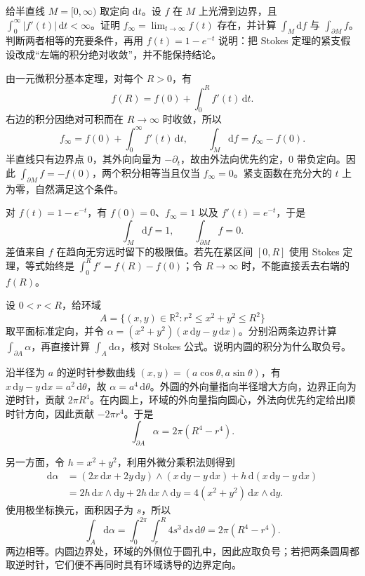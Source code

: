 \begin{exercise}\label{g1:ex:stokes-noncompact-end}
	给半直线 \(M=[0,\infty)\) 取定向 \(\mathrm{d}t\)。设 \(f\) 在 \(M\) 上光滑到边界，且 \(\int_0^\infty|f'(t)|\,\mathrm{d}t<\infty\)。证明 \(f_\infty=\lim_{t\to\infty}f(t)\) 存在，并计算 \(\int_M\mathrm{d}f\) 与 \(\int_{\partial M}f\)。判断两者相等的充要条件，再用 \(f(t)=1-e^{-t}\) 说明：把 Stokes 定理的紧支假设改成“左端的积分绝对收敛”，并不能保持结论。
\end{exercise}
\begin{solution}
	由一元微积分基本定理，对每个 \(R>0\)，有
	\[
		f(R)=f(0)+\int_0^R f'(t)\,\mathrm{d}t.
	\]
	右边的积分因绝对可积而在 \(R\to\infty\) 时收敛，所以
	\[
		f_\infty=f(0)+\int_0^\infty f'(t)\,\mathrm{d}t,\qquad
		\int_M\mathrm{d}f=f_\infty-f(0).
	\]
	半直线只有边界点 \(0\)，其外向向量为 \(-\partial_t\)，故由外法向优先约定，\(0\) 带负定向。因此 \(\int_{\partial M}f=-f(0)\)，两个积分相等当且仅当 \(f_\infty=0\)。紧支函数在充分大的 \(t\) 上为零，自然满足这个条件。

	对 \(f(t)=1-e^{-t}\)，有 \(f(0)=0\)、\(f_\infty=1\) 以及 \(f'(t)=e^{-t}\)，于是
	\[
		\int_M\mathrm{d}f=1,\qquad \int_{\partial M}f=0.
	\]
	差值来自 \(f\) 在趋向无穷远时留下的极限值。若先在紧区间 \([0,R]\) 使用 Stokes 定理，等式始终是 \(\int_0^R f'=f(R)-f(0)\)；令 \(R\to\infty\) 时，不能直接丢去右端的 \(f(R)\)。
\end{solution}

\begin{exercise}\label{g1:ex:stokes-annulus-orientation}
	设 \(0<r<R\)，给环域
	\[
		A=\{(x,y)\in\mathbb R^2:r^2\leq x^2+y^2\leq R^2\}
	\]
	取平面标准定向，并令 \(\alpha=(x^2+y^2)(x\,\mathrm{d}y-y\,\mathrm{d}x)\)。分别沿两条边界计算 \(\int_{\partial A}\alpha\)，再直接计算 \(\int_A\mathrm{d}\alpha\)，核对 Stokes 公式。说明内圆的积分为什么取负号。
\end{exercise}
\begin{solution}
	沿半径为 \(a\) 的逆时针参数曲线 \((x,y)=(a\cos\theta,a\sin\theta)\)，有 \(x\,\mathrm{d}y-y\,\mathrm{d}x=a^2\,\mathrm{d}\theta\)，故 \(\alpha=a^4\,\mathrm{d}\theta\)。外圆的外向量指向半径增大方向，边界正向为逆时针，贡献 \(2\pi R^4\)。在内圆上，环域的外向量指向圆心，外法向优先约定给出顺时针方向，因此贡献 \(-2\pi r^4\)。于是
	\[
		\int_{\partial A}\alpha=2\pi(R^4-r^4).
	\]

	另一方面，令 \(h=x^2+y^2\)，利用外微分乘积法则得到
	\begin{align*}
		\mathrm{d}\alpha
		&=(2x\,\mathrm{d}x+2y\,\mathrm{d}y)\wedge(x\,\mathrm{d}y-y\,\mathrm{d}x)
		+h\,\mathrm{d}(x\,\mathrm{d}y-y\,\mathrm{d}x)\\
		&=2h\,\mathrm{d}x\wedge\mathrm{d}y+2h\,\mathrm{d}x\wedge\mathrm{d}y
		=4(x^2+y^2)\,\mathrm{d}x\wedge\mathrm{d}y.
	\end{align*}
	使用极坐标换元，面积因子为 \(s\)，所以
	\[
		\int_A\mathrm{d}\alpha
		=\int_0^{2\pi}\int_r^R4s^3\,\mathrm{d}s\,\mathrm{d}\theta
		=2\pi(R^4-r^4).
	\]
	两边相等。内圆边界处，环域的外侧位于圆孔中，因此应取负号；若把两条圆周都取逆时针，它们便不再同时具有环域诱导的边界定向。
\end{solution}

